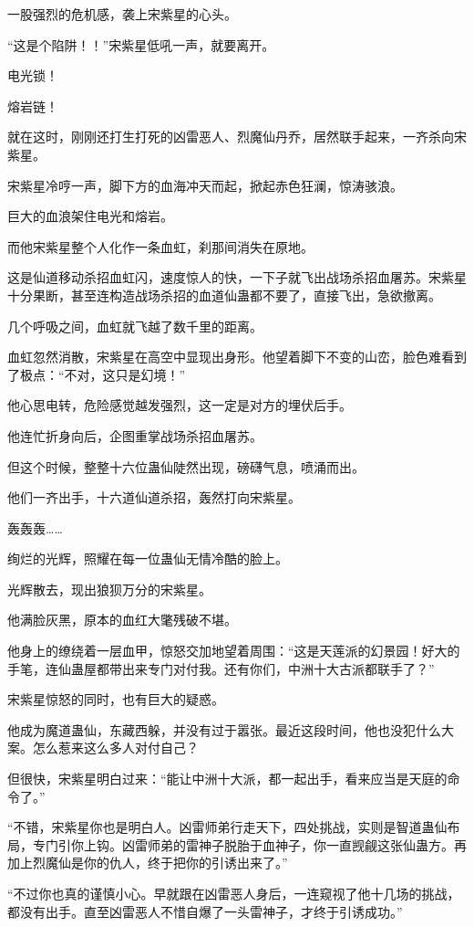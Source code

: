 \begin{this_body}
一股强烈的危机感，袭上宋紫星的心头。

“这是个陷阱！！”宋紫星低吼一声，就要离开。

电光锁！

熔岩链！

就在这时，刚刚还打生打死的凶雷恶人、烈魔仙丹乔，居然联手起来，一齐杀向宋紫星。

宋紫星冷哼一声，脚下方的血海冲天而起，掀起赤色狂澜，惊涛骇浪。

巨大的血浪架住电光和熔岩。

而他宋紫星整个人化作一条血虹，刹那间消失在原地。

这是仙道移动杀招血虹闪，速度惊人的快，一下子就飞出战场杀招血屠苏。宋紫星十分果断，甚至连构造战场杀招的血道仙蛊都不要了，直接飞出，急欲撤离。

几个呼吸之间，血虹就飞越了数千里的距离。

血虹忽然消散，宋紫星在高空中显现出身形。他望着脚下不变的山峦，脸色难看到了极点：“不对，这只是幻境！”

他心思电转，危险感觉越发强烈，这一定是对方的埋伏后手。

他连忙折身向后，企图重掌战场杀招血屠苏。

但这个时候，整整十六位蛊仙陡然出现，磅礴气息，喷涌而出。

他们一齐出手，十六道仙道杀招，轰然打向宋紫星。

轰轰轰……

绚烂的光辉，照耀在每一位蛊仙无情冷酷的脸上。

光辉散去，现出狼狈万分的宋紫星。

他满脸灰黑，原本的血红大氅残破不堪。

他身上的缭绕着一层血甲，惊怒交加地望着周围：“这是天莲派的幻景园！好大的手笔，连仙蛊屋都带出来专门对付我。还有你们，中洲十大古派都联手了？”

宋紫星惊怒的同时，也有巨大的疑惑。

他成为魔道蛊仙，东藏西躲，并没有过于嚣张。最近这段时间，他也没犯什么大案。怎么惹来这么多人对付自己？

但很快，宋紫星明白过来：“能让中洲十大派，都一起出手，看来应当是天庭的命令了。”

“不错，宋紫星你也是明白人。凶雷师弟行走天下，四处挑战，实则是智道蛊仙布局，专门引你上钩。凶雷师弟的雷神子脱胎于血神子，你一直觊觎这张仙蛊方。再加上烈魔仙是你的仇人，终于把你的引诱出来了。”

“不过你也真的谨慎小心。早就跟在凶雷恶人身后，一连窥视了他十几场的挑战，都没有出手。直至凶雷恶人不惜自爆了一头雷神子，才终于引诱成功。”


\end{this_body}
